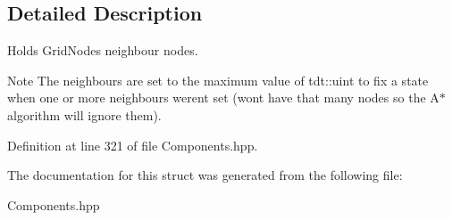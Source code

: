 \subsection{Detailed Description}
Holds Grid\+Node\textquotesingle{}s neighbour nodes. 

\begin{DoxyNote}{Note}
The neighbours are set to the maximum value of tdt\+::uint to fix a state when one or more neighbours weren\textquotesingle{}t set (won\textquotesingle{}t have that many nodes so the A$\ast$ algorithm will ignore them). 
\end{DoxyNote}


Definition at line 321 of file Components.\+hpp.



The documentation for this struct was generated from the following file\+:\begin{DoxyCompactItemize}
\item 
Components.\+hpp\end{DoxyCompactItemize}
